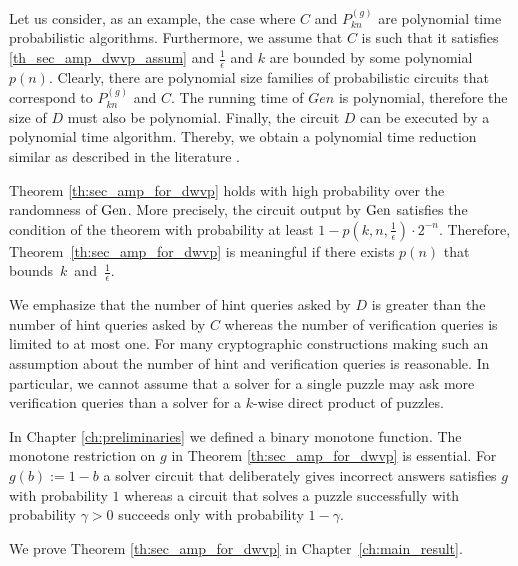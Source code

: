 Let us consider, as an example, the case where $C$ and $P_{kn}^{(g)}$ are polynomial time probabilistic algorithms.
Furthermore, we assume that $C$ is such that it satisfies \eqref{th_sec_amp_dwvp_assum}
and $\frac{1}{\epsilon}$ and $k$ are bounded by some polynomial $p(n)$.
Clearly, there are polynomial size families of probabilistic circuits that correspond to $P_{kn}^{(g)}$ and $C$.
The running time of $Gen$ is polynomial, therefore the size of $D$ must also be polynomial.
Finally, the circuit $D$ can be executed by a polynomial time algorithm.
Thereby, we obtain a polynomial time reduction similar as described in the literature \cite{Arora:2009:CCM:1540612, LectureNotesCrypo}.

Theorem \ref{th:sec_amp_for_dwvp} holds with high probability over the randomness of $\operatorname{\text{Gen}}$.
More precisely, the circuit output by $\operatorname{\text{Gen}}$ satisfies the condition of the theorem with probability
at least $1 - p(k, n, \frac{1}{\epsilon}) \cdot 2^{-n}$. Therefore, Theorem~\ref{th:sec_amp_for_dwvp} is meaningful if there exists $p(n)$
that bounds~$k$~and~$\frac{1}{\epsilon}$.

We emphasize that the number of hint queries asked by $D$ is greater than the number of hint queries asked by $C$ whereas the number of verification queries
is limited to at most one. For many cryptographic constructions making such an assumption about the number of hint and verification queries is reasonable.
In particular, we cannot assume that a solver for a single puzzle may ask more verification queries than a solver for a $k$-wise direct product of puzzles.

In Chapter \ref{ch:preliminaries} we defined a binary monotone function.
The monotone restriction on $g$ in Theorem \ref{th:sec_amp_for_dwvp} is essential. For $g(b) := 1 - b$ a solver circuit that deliberately gives incorrect
answers satisfies $g$ with probability $1$ whereas a circuit that solves a puzzle successfully with probability
$\gamma > 0$ succeeds only with probability $1 - \gamma$.

We prove Theorem \ref{th:sec_amp_for_dwvp} in Chapter~\ref{ch:main_result}.


